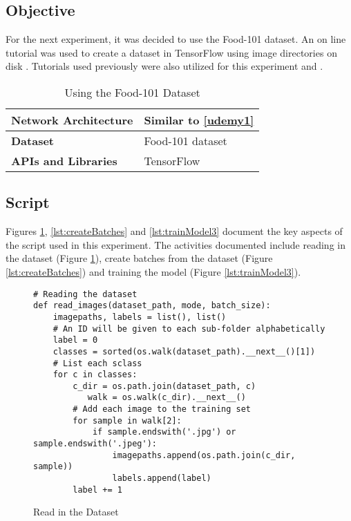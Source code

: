 \tocless\subsection{Objective}
For the next experiment, it was decided to use the Food-101 dataset.
An on line tutorial was used to create a dataset in TensorFlow using image directories on disk \parencite{file_dir_code}.
Tutorials used previously were also utilized for this experiment \parencite{udemy} and \parencite{cifar}.

\begin{table}[h]
\centering
\caption{Using the Food-101 Dataset}
\label{my-label}
\begin{tabular}{|l|p{8cm}|}
\hline
\textbf{Network Architecture} & Similar to \ref{udemy1}            \\ \hline
\textbf{Dataset}              & Food-101 dataset \\ \hline
\textbf{APIs and Libraries}   & TensorFlow                                                         \\ \hline
\end{tabular}
\end{table}

\tocless\subsection{Script}
Figures \ref{lst:readDataset}, \ref{lst:createBatches} and \ref{lst:trainModel3} document the key aspects of the script used in this experiment.
The activities documented include reading in the dataset (Figure \ref{lst:readDataset}), create batches from the dataset (Figure \ref{lst:createBatches}) and training the model (Figure \ref{lst:trainModel3}).

\begin{figure}[h] 
\caption{Read in the Dataset \parencite{file_dir_code}}
\label{lst:readDataset}
\begin{lstlisting}[style=Python]
# Reading the dataset
def read_images(dataset_path, mode, batch_size):
    imagepaths, labels = list(), list()
    # An ID will be given to each sub-folder alphabetically
    label = 0
    classes = sorted(os.walk(dataset_path).__next__()[1])
    # List each sclass
    for c in classes:
        c_dir = os.path.join(dataset_path, c)
           walk = os.walk(c_dir).__next__()
        # Add each image to the training set
        for sample in walk[2]:
            if sample.endswith('.jpg') or sample.endswith('.jpeg'):
                imagepaths.append(os.path.join(c_dir, sample))
                labels.append(label)
        label += 1
\end{lstlisting}
\end{figure}

